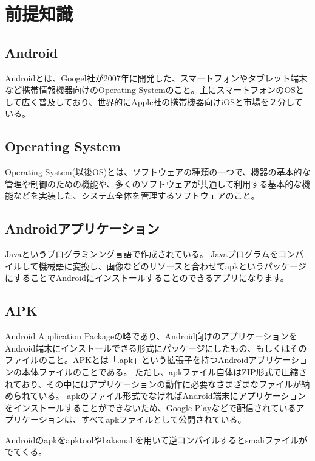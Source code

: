 \newpage
\section{前提知識}

\subsection{Android}
Androidとは、Googel社が2007年に開発した、スマートフォンやタブレット端末など携帯情報機器向けのOperating Systemのこと。主にスマートフォンのOSとして広く普及しており、世界的にApple社の携帯機器向けiOSと市場を２分している。

\subsection{Operating System}
Operating System(以後OS)とは、ソフトウェアの種類の一つで、機器の基本的な管理や制御のための機能や、多くのソフトウェアが共通して利用する基本的な機能などを実装した、システム全体を管理するソフトウェアのこと。

\subsection{Androidアプリケーション}
Javaというプログラミンング言語で作成されている。
Javaプログラムをコンパイルして機械語に変換し、画像などのリソースと合わせてapkというパッケージにすることでAndroidにインストールすることのできるアプリになります。

\subsection{APK}
Android Application Packageの略であり、Android向けのアプリケーションをAndroid端末にインストールできる形式にパッケージにしたもの、もしくはそのファイルのこと。APKとは「.apk」という拡張子を持つAndroidアプリケーションの本体ファイルのことである。
ただし、apkファイル自体はZIP形式で圧縮されており、その中にはアプリケーションの動作に必要なさまざまなファイルが納められている。
apkのファイル形式でなければAndroid端末にアプリケーションをインストールすることができないため、Google Playなどで配信されているアプリケーションは、すべてapkファイルとして公開されている。

Androidのapkをapktoolやbaksmaliを用いて逆コンパイルするとsmaliファイルがでてくる。
